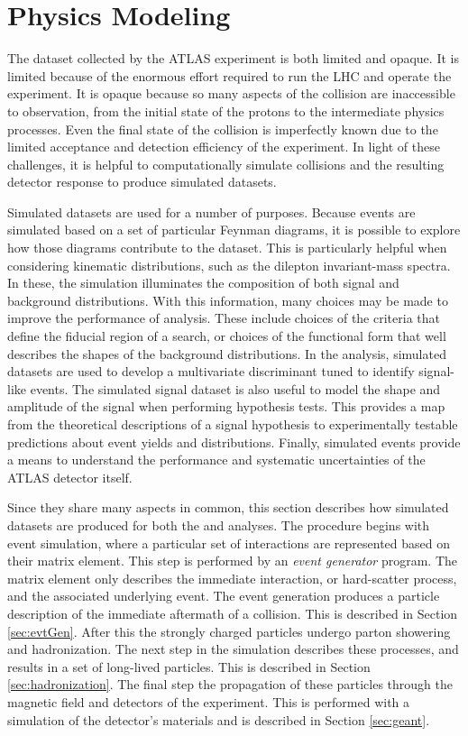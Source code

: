 \section{Physics Modeling}

The dataset collected by the ATLAS experiment is both limited and opaque.
It is limited because of the enormous effort required to run the LHC and operate the experiment.
It is opaque because so many aspects of the collision are inaccessible to observation, from the initial state of the protons to the intermediate physics processes.
Even the final state of the collision is imperfectly known due to the limited acceptance and detection efficiency of the experiment.
In light of these challenges, it is helpful to computationally simulate collisions and the resulting detector response to produce simulated datasets.

Simulated datasets are used for a number of purposes.
Because events are simulated based on a set of particular Feynman diagrams, it is possible to explore how those diagrams contribute to the dataset.
This is particularly helpful when considering kinematic distributions, such as the dilepton invariant-mass spectra.
In these, the simulation illuminates the composition of both signal and background distributions.
With this information, many choices may be made to improve the performance of analysis.
These include choices of the criteria that define the fiducial region of a search, or choices of the functional form that well describes the shapes of the background distributions.
In the \hmm analysis, simulated datasets are used to develop a multivariate discriminant tuned to identify signal-like events.
The simulated signal dataset is also useful to model the shape and amplitude of the signal when performing hypothesis tests.
This provides a map from the theoretical descriptions of a signal hypothesis to experimentally testable predictions about event yields and distributions.
Finally, simulated events provide a means to understand the performance and systematic uncertainties of the ATLAS detector itself.

Since they share many aspects in common, this section describes how simulated datasets are produced for both the \hmm and \nr analyses.
The procedure begins with event simulation, where a particular set of interactions are represented based on their matrix element.
This step is performed by an \emph{event generator} program.
The matrix element only describes the immediate interaction, or hard-scatter process, and the associated underlying event.
The event generation produces a particle description of the immediate aftermath of a collision. This is described in Section \ref{sec:evtGen}.
After this the strongly charged particles undergo parton showering and hadronization.
The next step in the simulation describes these processes, and results in a set of long-lived particles. This is described in Section \ref{sec:hadronization}.
The final step the propagation of these particles through the magnetic field and detectors of the experiment.
This is performed with a simulation of the detector's materials and is described in Section \ref{sec:geant}.


